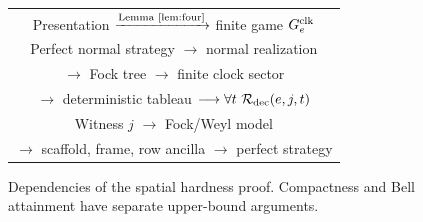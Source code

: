 \begin{figure}[ht]
\centering\small
\begin{tabular}{@{}c@{}}
Presentation $\xrightarrow{\text{Lemma~\ref{lem:four}}}$ finite game $G^{\rm clk}_e$\\[4pt]
Perfect normal strategy $\longrightarrow$ normal realization\\[2pt]
$\longrightarrow$ Fock tree $\longrightarrow$ finite clock sector\\[2pt]
$\longrightarrow$ deterministic tableau $\longrightarrow\forall t\ \mathcal R_{\rm dec}(e,j,t)$\\[4pt]
Witness $j$ $\longrightarrow$ Fock/Weyl model\\[2pt]
$\longrightarrow$ scaffold, frame, row ancilla $\longrightarrow$ perfect strategy
\end{tabular}
\caption{Dependencies of the spatial hardness proof. Compactness and Bell attainment have separate upper-bound arguments.}\label{fig:dependencies}
\end{figure}

